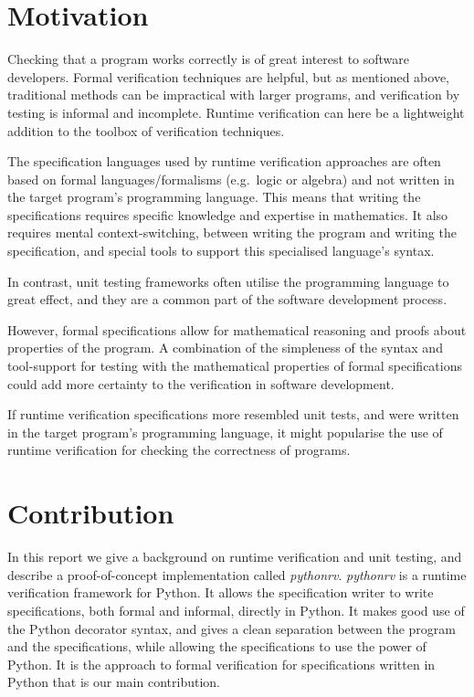 \section{Motivation}

Checking that a program works correctly is of great interest to software
developers. Formal verification techniques are helpful, but as mentioned above,
traditional methods can be impractical with larger programs, and verification
by testing is informal and incomplete. Runtime verification can here be a
lightweight addition to the toolbox of verification techniques.

The specification languages used by runtime verification approaches are often
based on formal languages/formalisms (e.g.\ logic or algebra) and not written
in the target program's programming language. This means that writing the
specifications requires specific knowledge and expertise in mathematics. It
also requires mental context-switching, between writing the program and writing
the specification, and special tools to support this specialised language's
syntax.

In contrast, unit testing frameworks often utilise the programming language to
great effect, and they are a common part of the software development process.

However, formal specifications allow for mathematical reasoning and proofs
about properties of the program. A combination of the simpleness of the syntax
and tool-support for testing with the mathematical properties of formal
specifications could add more certainty to the verification in software
development.

If runtime verification specifications more resembled unit tests, and were
written in the target program's programming language, it might popularise the
use of runtime verification for checking the correctness of programs.


\section{Contribution}

In this report we give a background on runtime verification and unit testing,
and describe a proof-of-concept implementation called \textit{pythonrv}.
\textit{pythonrv} is a runtime verification framework for Python. It allows the
specification writer to write specifications, both formal and informal,
directly in Python. It makes good use of the Python decorator syntax, and gives
a clean separation between the program and the specifications, while allowing
the specifications to use the power of Python. It is the approach to formal
verification for specifications written in Python that is our main
contribution.

